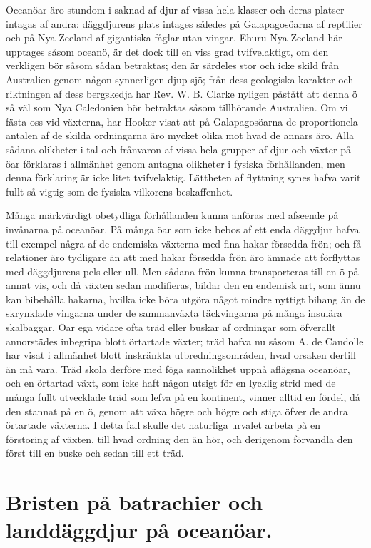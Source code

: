 Oceanöar äro stundom i saknad af djur af vissa hela klasser och deras platser intagas af andra: däggdjurens plats intages således på Galapagosöarna af reptilier och på Nya Zeeland af gigantiska fåglar utan vingar. Ehuru Nya Zeeland här upptages såsom oceanö, är det dock till en viss grad tvifvelaktigt, om den verkligen bör såsom sådan betraktas; den är särdeles stor och icke skild från Australien genom någon synnerligen djup sjö; från dess geologiska karakter och riktningen af dess bergskedja har Rev. W. B. Clarke nyligen påstått att denna ö så väl som Nya Caledonien bör betraktas såsom tillhörande Australien. Om vi fästa oss vid växterna, har Hooker visat att på Galapagosöarna de proportionela antalen af de skilda ordningarna äro mycket olika mot hvad de annars äro. Alla sådana olikheter i tal och frånvaron af vissa hela grupper af djur och växter på öar förklaras i allmänhet genom antagna olikheter i fysiska förhållanden, men denna förklaring är icke litet tvifvelaktig. Lättheten af flyttning synes hafva varit fullt så vigtig som de fysiska vilkorens beskaffenhet.

Många märkvärdigt obetydliga förhållanden kunna anföras med afseende på invånarna på oceanöar. På många öar som icke bebos af ett enda däggdjur hafva till exempel några af de endemiska växterna med fina hakar försedda frön; och få relationer äro tydligare än att med hakar försedda frön äro ämnade att förflyttas med däggdjurens pels eller ull. Men sådana frön kunna transporteras till en ö på annat vis, och då växten sedan modifieras, bildar den en endemisk art, som ännu kan bibehålla hakarna, hvilka icke böra utgöra något mindre nyttigt bihang än de skrynklade vingarna under de sammanväxta täckvingarna på många insulära skalbaggar. Öar ega vidare ofta träd eller buskar af ordningar som öfverallt annorstädes inbegripa blott örtartade växter; träd hafva nu såsom A. de Candolle har visat i allmänhet blott inskränkta utbredningsområden, hvad orsaken dertill än må vara. Träd skola derföre med föga sannolikhet uppnå aflägsna oceanöar, och en örtartad växt, som icke haft någon utsigt för en lycklig strid med de många fullt utvecklade träd som lefva på en kontinent, vinner alltid en fördel, då den stannat på en ö, genom att växa högre och högre och stiga öfver de andra örtartade växterna. I detta fall skulle det naturliga urvalet arbeta på en förstoring af växten, till hvad ordning den än hör, och derigenom förvandla den först till en buske och sedan till ett träd.



\section[Landdäggdjur på oceanöar]{Bristen på batrachier och landdäggdjur på oceanöar.}

